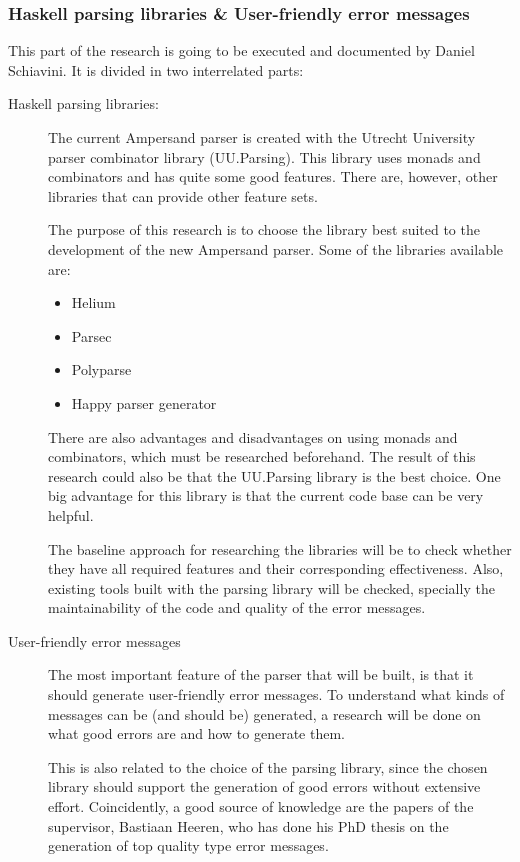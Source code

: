 \subsubsection{Haskell parsing libraries \& User-friendly error messages}
This part of the research is going to be executed and documented by Daniel Schiavini.
It is divided in two interrelated parts:
\begin{description}
	\item [Haskell parsing libraries:]
	The current Ampersand parser is created with the Utrecht University parser combinator library (UU.Parsing).
	This library uses monads and combinators and has quite some good features.
	There are, however, other libraries that can provide other feature sets.
	
	The purpose of this research is to choose the library best suited to the development of the new Ampersand parser.
	Some of the libraries available are:
	\begin{itemize}
		\item Helium
		\item Parsec
		\item Polyparse
		\item Happy parser generator
	\end{itemize}
	There are also advantages and disadvantages on using monads and combinators, which must be researched beforehand.
	The result of this research could also be that the UU.Parsing library is the best choice.
	One big advantage for this library is that the current code base can be very helpful.

	The baseline approach for researching the libraries will be to check whether they have all required features and their corresponding effectiveness.
	Also, existing tools built with the parsing library will be checked, specially the maintainability of the code and quality of the error messages.

	\item [User-friendly error messages]
	The most important feature of the parser that will be built, is that it should generate user-friendly error messages.
	To understand what kinds of messages can be (and should be) generated, a research will be done on what good errors are and how to generate them.
	
	This is also related to the choice of the parsing library, since the chosen library should support the generation of good errors without extensive effort.
	Coincidently, a good source of knowledge are the papers of the supervisor, Bastiaan Heeren, who has done his PhD thesis on the generation of top quality type error messages\cite{heeren-error}.
\end{description}

